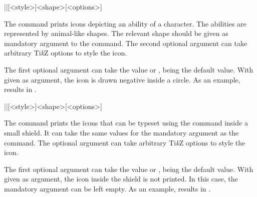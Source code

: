 \documentclass[a4paper]{article}
\begin{document}
\begin{macrodef}|\ability|[<style>]{<shape>}[<options>]\end{macrodef}
The command \macro{\ability} prints icons depicting an ability of a character. The abilities are represented by animal-like shapes. The relevant shape should be given as mandatory argument to the command. The second optional argument can take arbitrary Ti\emph{k}Z options to style the icon.

The first optional argument can take the value  or ,  being the default value. With  given as argument, the icon is drawn negative inside a circle. As an example,  results in .

\begin{macrodef}|\saving|[<style>]{<shape>}[<options>]\end{macrodef}
The command \macro{\saving} prints the icons that can be typeset using the \macro{\ability} command inside a small shield. It can take the same values for the mandatory argument as the \macro{\ability} command. The optional argument can take arbitrary Ti\emph{k}Z options to style the icon.

The first optional argument can take the value  or ,  being the default value. With  given as argument, the icon inside the shield is not printed. In this case, the mandatory argument can be left empty. As an example, \macro{\saving[empty]{}} results in \saving[empty]{}. 
\end{document}
